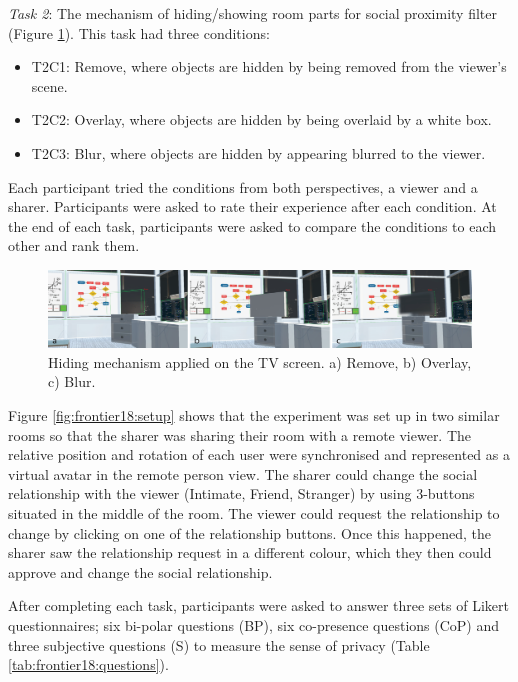 \textit{Task 2}: The mechanism of hiding/showing room parts for social proximity filter (Figure \ref{fig:frontier18:hiding-mechanism}). This task had three conditions:

\begin{itemize}
    \item T2C1: Remove, where objects are hidden by being removed from the viewer's scene.
    \item T2C2: Overlay, where objects are hidden by being overlaid by a white box. 
    \item T2C3: Blur, where objects are hidden by appearing blurred to the viewer. 
\end{itemize}

Each participant tried the conditions from both perspectives, a viewer and a sharer. Participants were asked to rate their experience after each condition. At the end of each task, participants were asked to compare the conditions to each other and rank them. 

\begin{figure}
\begin{center}
\includegraphics[width=\linewidth]{images/frontier18/images-01.png}
\caption{Hiding mechanism applied on the TV screen. a) Remove, b) Overlay, c) Blur.}\label{fig:frontier18:hiding-mechanism}
\end{center}
\end{figure}

Figure \ref{fig:frontier18:setup} shows that the experiment was set up in two similar rooms so that the sharer was sharing their room with a remote viewer. The relative position and rotation of each user were synchronised and represented as a virtual avatar in the remote person view. The sharer could change the social relationship with the viewer (Intimate, Friend, Stranger) by using 3-buttons situated in the middle of the room. The viewer could request the relationship to change by clicking on one of the relationship buttons. Once this happened, the sharer saw the relationship request in a different colour, which they then could approve and change the social relationship.

After completing each task, participants were asked to answer three sets of Likert questionnaires; six bi-polar questions (BP), six co-presence questions (CoP) and three subjective questions (S) to measure the sense of privacy (Table \ref{tab:frontier18:questions}).  


